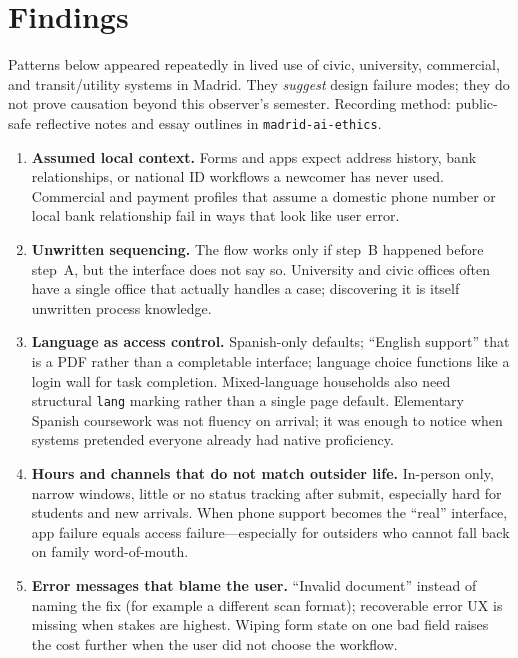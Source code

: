 \documentclass[10pt,twocolumn]{article}
\begin{document}
\section{Findings}
Patterns below appeared repeatedly in lived use of civic, university,
commercial, and transit/utility systems in Madrid. They \emph{suggest} design
failure modes; they do not prove causation beyond this observer's semester.
Recording method: public-safe reflective notes and essay outlines in
\texttt{madrid-ai-ethics}.

\begin{enumerate}
  \item \textbf{Assumed local context.} Forms and apps expect address history,
        bank relationships, or national ID workflows a newcomer has never used.
        Commercial and payment profiles that assume a domestic phone number or
        local bank relationship fail in ways that look like user error.
  \item \textbf{Unwritten sequencing.} The flow works only if step~B happened
        before step~A, but the interface does not say so. University and civic
        offices often have a single office that actually handles a case; discovering
        it is itself unwritten process knowledge.
  \item \textbf{Language as access control.} Spanish-only defaults; ``English
        support'' that is a PDF rather than a completable interface; language
        choice functions like a login wall for task completion. Mixed-language
        households also need structural \texttt{lang} marking rather than a single
        page default. Elementary Spanish coursework was not fluency on arrival; it
        was enough to notice when systems pretended everyone already had native
        proficiency.
  \item \textbf{Hours and channels that do not match outsider life.} In-person
        only, narrow windows, little or no status tracking after submit,
        especially hard for students and new arrivals. When phone support becomes
        the ``real'' interface, app failure equals access failure---especially for
        outsiders who cannot fall back on family word-of-mouth.
  \item \textbf{Error messages that blame the user.} ``Invalid document'' instead
        of naming the fix (for example a different scan format); recoverable
        error UX is missing when stakes are highest. Wiping form state on one bad
        field raises the cost further when the user did not choose the workflow.
\end{enumerate}
\end{document}
